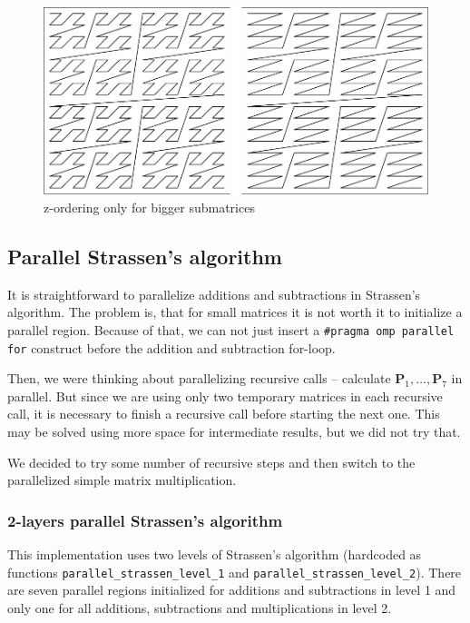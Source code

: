 \documentclass{article}
\begin{document}
\begin{figure}[htbp]
\centerline{\includegraphics[scale=.5]{partly_z_ordering.pdf}}
\caption{z-ordering only for bigger submatrices}
\label{z_partly}
\end{figure}


\subsection{Parallel Strassen's algorithm}

It is straightforward to parallelize additions and subtractions in Strassen's algorithm.
The problem is, that for small matrices it is not worth it to initialize a parallel region.
Because of that, we can not just insert a \texttt{\#pragma omp parallel for} construct before
the addition and subtraction for-loop.

Then, we were thinking about parallelizing recursive calls -- calculate $\mathbf{P}_1, \ldots, \mathbf{P}_7$ in parallel.
But since we are using only two temporary matrices in each recursive call, it is necessary to finish
a recursive call before starting the next one. This may be solved using more space for intermediate
results, but we did not try that.

We decided to try some number of recursive steps and then switch to the parallelized simple matrix multiplication.

\subsubsection{2-layers parallel Strassen's algorithm}

This implementation uses two levels of Strassen's algorithm (hardcoded as functions 
\texttt{parallel\_strassen\_level\_1} and \texttt{parallel\_strassen\_level\_2}). There are seven
parallel regions initialized for additions and subtractions in level 1 and only one for 
all additions, subtractions and multiplications in level 2.
\end{document}
